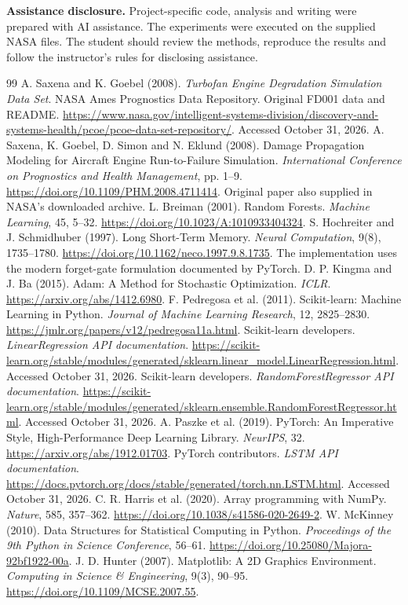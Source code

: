 \documentclass[11pt]{article}
\begin{document}
\textbf{Assistance disclosure.} Project-specific code, analysis and writing were prepared with AI assistance. The experiments were executed on the supplied NASA files. The student should review the methods, reproduce the results and follow the instructor's rules for disclosing assistance.
\clearpage
\begin{thebibliography}{99}\small
{} A. Saxena and K. Goebel (2008). \textit{Turbofan Engine Degradation Simulation Data Set}. NASA Ames Prognostics Data Repository. Original FD001 data and README. \url{https://www.nasa.gov/intelligent-systems-division/discovery-and-systems-health/pcoe/pcoe-data-set-repository/}. Accessed October 31, 2026.
 A. Saxena, K. Goebel, D. Simon and N. Eklund (2008). Damage Propagation Modeling for Aircraft Engine Run-to-Failure Simulation. \textit{International Conference on Prognostics and Health Management}, pp. 1--9. \url{https://doi.org/10.1109/PHM.2008.4711414}. Original paper also supplied in NASA's downloaded archive.
 L. Breiman (2001). Random Forests. \textit{Machine Learning}, 45, 5--32. \url{https://doi.org/10.1023/A:1010933404324}.
 S. Hochreiter and J. Schmidhuber (1997). Long Short-Term Memory. \textit{Neural Computation}, 9(8), 1735--1780. \url{https://doi.org/10.1162/neco.1997.9.8.1735}. The implementation uses the modern forget-gate formulation documented by PyTorch.
 D. P. Kingma and J. Ba (2015). Adam: A Method for Stochastic Optimization. \textit{ICLR}. \url{https://arxiv.org/abs/1412.6980}.
 F. Pedregosa et al. (2011). Scikit-learn: Machine Learning in Python. \textit{Journal of Machine Learning Research}, 12, 2825--2830. \url{https://jmlr.org/papers/v12/pedregosa11a.html}.
 Scikit-learn developers. \textit{LinearRegression API documentation}. \url{https://scikit-learn.org/stable/modules/generated/sklearn.linear_model.LinearRegression.html}. Accessed October 31, 2026.
 Scikit-learn developers. \textit{RandomForestRegressor API documentation}. \url{https://scikit-learn.org/stable/modules/generated/sklearn.ensemble.RandomForestRegressor.html}. Accessed October 31, 2026.
 A. Paszke et al. (2019). PyTorch: An Imperative Style, High-Performance Deep Learning Library. \textit{NeurIPS}, 32. \url{https://arxiv.org/abs/1912.01703}.
 PyTorch contributors. \textit{LSTM API documentation}. \url{https://docs.pytorch.org/docs/stable/generated/torch.nn.LSTM.html}. Accessed October 31, 2026.
 C. R. Harris et al. (2020). Array programming with NumPy. \textit{Nature}, 585, 357--362. \url{https://doi.org/10.1038/s41586-020-2649-2}.
 W. McKinney (2010). Data Structures for Statistical Computing in Python. \textit{Proceedings of the 9th Python in Science Conference}, 56--61. \url{https://doi.org/10.25080/Majora-92bf1922-00a}.
 J. D. Hunter (2007). Matplotlib: A 2D Graphics Environment. \textit{Computing in Science \& Engineering}, 9(3), 90--95. \url{https://doi.org/10.1109/MCSE.2007.55}.
\end{thebibliography}
\end{document}
